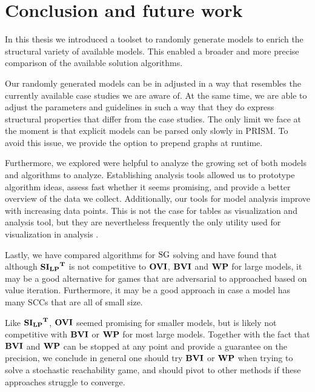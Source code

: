 \chapter{Conclusion and future work} \label{ch:conclusion}
In this thesis we introduced a toolset to randomly generate models to enrich the structural variety of available models.
This enabled a broader and more precise comparison of the available solution algorithms.

Our randomly generated models can be in adjusted in a way that resembles the currently available case studies we are aware of.
At the same time, we are able to adjust the parameters and guidelines in such a way that they do express structural properties that differ from the case studies.
The only limit we face at the moment is that explicit models can be parsed only slowly in PRISM. 
To avoid this issue, we provide the option to prepend graphs at runtime.

Furthermore, we explored were helpful to analyze the growing set of both models and algorithms to analyze.
Establishing analysis tools allowed us to prototype algorithm ideas, assess fast whether it seems promising,
and provide a better overview of the data we collect. 
Additionally, our tools for model analysis improve with increasing data points.
This is not the case for tables as visualization and analysis tool, 
but they are nevertheless frequently the only utility used for visualization in analysis \cite{paperMaxi}\cite{widestPath}\cite{learningBased}.

Lastly, we have compared algorithms for $\textrm{SG}$ solving and have found that although $\mathbf{\mathbf{SI_{LP}}^T}$ is not competitive to $\mathbf{OVI}$, $\mathbf{BVI}$ and $\mathbf{WP}$ for large models,
it may be a good alternative for games that are adversarial to approached based on value iteration. 
Furthermore, it may be a good approach in case a model has many SCCs that are all of small size.

Like $\mathbf{\mathbf{SI_{LP}}^T}$, $\mathbf{OVI}$ seemed promising for smaller models, but is likely not competitive with $\mathbf{BVI}$ or $\mathbf{WP}$ for most large models.
Together with the fact that $\mathbf{BVI}$ and $\mathbf{WP}$ can be stopped at any point and provide a guarantee on the precision, 
we conclude in general one should try $\mathbf{BVI}$ or $\mathbf{WP}$ when trying to solve a stochastic reachability game, 
and should pivot to other methods if these approaches struggle to converge.

